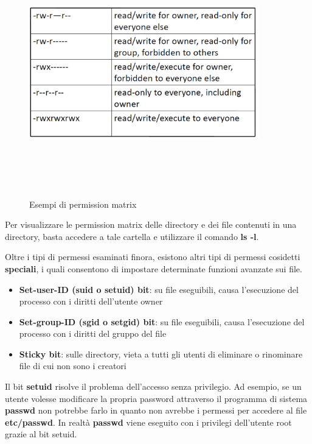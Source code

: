 \begin{figure}[htbp]
	\centering%
	\subfigure%
	{\includegraphics[height=10cm, width=10cm, keepaspectratio]{Immagini/sistemi_operativi/perm_linux.png}}
	\caption{Esempi di permission matrix \label{fig:perm_linux}} 	
\end{figure}

Per visualizzare le permission matrix delle directory e dei file contenuti in una directory, basta accedere a tale cartella e utilizzare il comando \textbf{ls -l}. \newline \newline

Oltre i tipi di permessi esaminati finora, esistono altri tipi di permessi cosidetti \textbf{speciali}, i quali consentono di impostare determinate funzioni avanzate sui file.

\begin{itemize}
  \item \textbf{Set-user-ID (suid o setuid) bit}: su file eseguibili, causa l'esecuzione del processo con i diritti dell'utente owner
  \item \textbf{Set-group-ID (sgid o setgid) bit}: su file eseguibili, causa l'esecuzione del processo con i diritti del gruppo del file
  \item \textbf{Sticky bit}: sulle directory, vieta a tutti gli utenti di eliminare o rinominare file di cui non sono i creatori
\end{itemize}

Il bit \textbf{setuid} risolve il problema dell'accesso senza privilegio. Ad esempio, se un utente volesse modificare la propria password attraverso il programma di sistema \textbf{passwd} non potrebbe farlo in quanto non avrebbe i permessi per accedere al file \textbf{etc/passwd}. In realtà \textbf{passwd} viene eseguito con i privilegi dell'utente root grazie al bit setuid.

